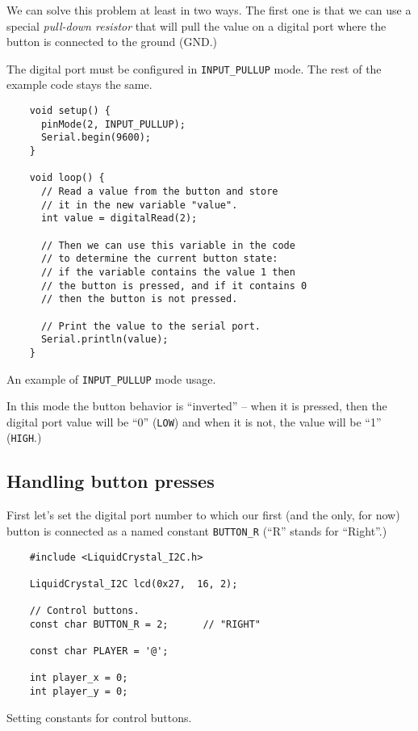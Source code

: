 \documentclass[../sparc.tex]{subfiles}
\begin{document}
We can solve this problem at least in two ways.  The first one is that we can
use a special \emph{pull-down resistor} that will pull the value on a digital
port where the button is connected to the ground (GND.)


The digital port must be configured in \texttt{INPUT_PULLUP} mode.  The
rest of the example code stays the same.

\begin{listing}[H]
  \begin{verbatim}
    void setup() {
      pinMode(2, INPUT_PULLUP);
      Serial.begin(9600);
    }

    void loop() {
      // Read a value from the button and store
      // it in the new variable "value".
      int value = digitalRead(2);

      // Then we can use this variable in the code
      // to determine the current button state:
      // if the variable contains the value 1 then
      // the button is pressed, and if it contains 0
      // then the button is not pressed.

      // Print the value to the serial port.
      Serial.println(value);
    }
  \end{verbatim}
  \caption{An example of \texttt{INPUT_PULLUP} mode usage.}
  \label{listing:game-dev-input-pullup-example}
\end{listing}

In this mode the button behavior is ``inverted'' -- when it is pressed, then the
digital port value will be ``0'' (\texttt{LOW}) and when it is not, the
value will be ``1'' (\texttt{HIGH}.)

\subsection{Handling button presses}

First let's set the digital port number to which our first (and the only, for
now) button is connected as a named constant \texttt{BUTTON_R} (``R''
stands for ``Right''.)

\begin{listing}[H]
  \begin{verbatim}
    #include <LiquidCrystal_I2C.h>

    LiquidCrystal_I2C lcd(0x27,  16, 2);

    // Control buttons.
    const char BUTTON_R = 2;      // "RIGHT"

    const char PLAYER = '@';

    int player_x = 0;
    int player_y = 0;
  \end{verbatim}
  \caption{Setting constants for control buttons.}
  \label{listing:game-dev-button-constants}
\end{listing}
\end{document}
